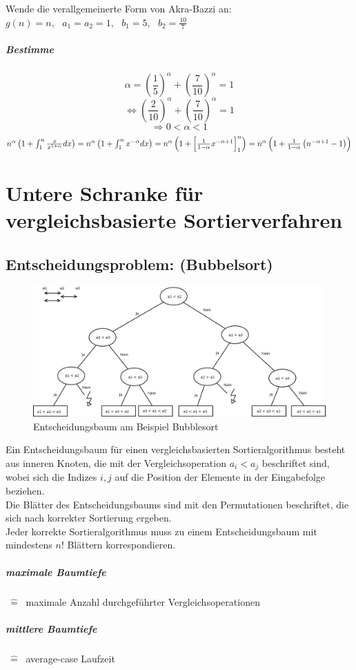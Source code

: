 Wende die verallgemeinerte Form von Akra-Bazzi an:\\
$g(n)=n, ~~~a_1=a_2=1, ~~~b_1=5, ~~~b_2=\frac{10}{7}$\\
\paragraph{Bestimme}
\[\alpha = \left(\frac{1}{5}\right)^{\alpha} + \left(\frac{7}{10}\right)^{\alpha} = 1\]
\[\Leftrightarrow \left(\frac{2}{10}\right)^{\alpha} + \left(\frac{7}{10}\right)^{\alpha} = 1\]
\[\Rightarrow 0 < \alpha < 1 \]
	\[\textstyle\centering n^{\alpha}\left(1+\int_1^n \frac{x}{x^{1+\alpha}} dx\right) = n^{\alpha}\left(1+\int_1^n x^{-\alpha} dx\right) = n^{\alpha}\left(1+ \left[\frac{1}{1-\alpha} x^{-\alpha+1} \right]_1^n\right) = n^{\alpha}\left(1+\frac{1}{1-\alpha} \left(n^{-\alpha+1}-1\right)\right)\]


\chapter{Untere Schranke für vergleichsbasierte Sortierverfahren}
\section{Entscheidungsproblem: (Bubbelsort)}
\begin{figure}[h]
	\centering
\includegraphics[width=\linewidth]{08/Grafik/img2.png}
\caption{Entscheidungsbaum am Beispiel Bubblesort}
\end{figure}


Ein Entscheidungsbaum für einen vergleichsbasierten Sortieralgorithmus besteht aus inneren Knoten, die mit der Vergleichsoperation $a_i < a_j$ beschriftet sind, wobei sich die Indizes $i,j$ auf die Position der Elemente in der Eingabefolge beziehen.\\
Die Blätter des Entscheidungsbaums sind mit den Permutationen beschriftet, die sich nach korrekter Sortierung ergeben.\\
Jeder korrekte Sortieralgorithmus muss zu einem Entscheidungsbaum mit mindestens $n!$ Blättern korrespondieren.\\
\paragraph{maximale Baumtiefe} $~\hat{=}~$ maximale Anzahl durchgeführter Vergleichsoperationen\\
\paragraph{mittlere Baumtiefe} $~\hat{=}~$ average-case Laufzeit

